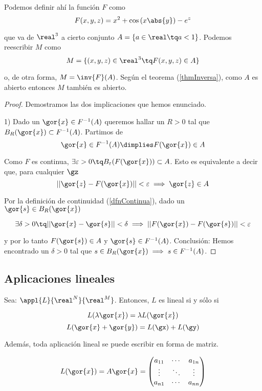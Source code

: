 \documentclass{apuntes}
\begin{document}
Podemos definir ahí la función $F$ como 
\[ F(x,y,z) = x^2 + \cos\left(x\abs{y}\right) - e^z\]

que va de $\real^3$ a cierto conjunto $A = \{ a \in \real \tq a < 1 \}$. Podemos reescribir $M$ como
\[M=\{(x,y,z) \in \real^3 \tq  F(x,y,z) \in A\}\]

o, de otra forma, $M = \inv{F}(A)$. Según el teorema (\ref{thmInversa}), como $A$ es abierto entonces $M$ también es abierto.

\begin{proof} Demostramos las dos implicaciones que hemos enunciado.

1) Dado un $\gor{x} \in F^{-1} (A)$ queremos hallar un $R>0$ tal que $B_R(\gor{x})\subset F^{-1} (A)$. Partimos de 
\[\gor{x}\in F^{-1} (A) \dimplies F(\gor{x})\in A\]

Como $F$ es continua, $\exists \varepsilon>0 \tq B_{\varepsilon}(F(\gor{x}))\subset A$. Esto es equivalente a decir que, para cualquier $\gz$
\[ ||\gor{z}-F(\gor{x})|| < \varepsilon \implies \gor{z}\in A\]

Por la definición de continuidad (\ref{dfnContinua}), dado un $\gor{s}\in B_R(\gor{x})$ 

\[ \exists \delta > 0 \tq ||\gor{x}-\gor{s}||<\delta \implies ||F(\gor{x})-F(\gor{s})||< \varepsilon \]


y por lo tanto $F(\gor{s}) \in A$ y $\gor{s} \in F^{-1} (A)$.
Conclusión: Hemos encontrado un $\delta > 0$ tal que $s \in B_R(\gor{x}) \implies s \in F^{-1} (A)$.
\end{proof}

\subsection{Aplicaciones lineales}

\begin{defn}

Sea: $\appl{L}{\real^N}{\real^M}$. Entonces, $L$ es lineal si y sólo si

\[ L(\lambda \gor{x}) = \lambda L(\gor{x}) \] 
\[ L(\gor{x}+\gor{y}) = L(\gx)+L(\gy)\] 

\end{defn}
Además, toda aplicación lineal se puede escribir en forma de matriz.

\[L(\gor{x})=A\gor{x} =
\begin{pmatrix}
a_{11} 	& \cdots & a_{1n}		\\
\vdots	& \ddots &  \vdots 	\\
a_{n1}	& \cdots & a_{nn} 
\end{pmatrix}\]
\end{document}
